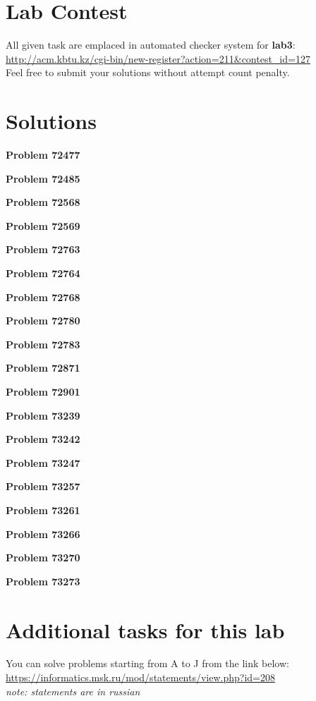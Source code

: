\documentclass[12pt]{article}
\begin{document}
    \section{Lab Contest}
        \small
        All given task are emplaced in automated checker system for \textbf{lab3}:
        \\ \url{http://acm.kbtu.kz/cgi-bin/new-register?action=211&contest_id=127}
        \\ Feel free to submit your solutions without attempt count penalty.
        
    \section{Solutions}
        \textbf{Problem 72477}
        
        \textbf{Problem 72485}
        
        \textbf{Problem 72568}
        
        \textbf{Problem 72569}
        
        \textbf{Problem 72763}
        
        \textbf{Problem 72764}
        
        \textbf{Problem 72768}
        
        \textbf{Problem 72780}
        
        \textbf{Problem 72783}
        
        \textbf{Problem 72871}
        
        \textbf{Problem 72901}
        
        \textbf{Problem 73239}
        
        \textbf{Problem 73242}
        
        \textbf{Problem 73247}
        
        \textbf{Problem 73257}
        
        \textbf{Problem 73261}
        
        \textbf{Problem 73266}
        
        \textbf{Problem 73270}
        
        \textbf{Problem 73273}
        


    \section{Additional tasks for this lab}
    You can solve problems starting from A to J from the link below:\\
    \url{https://informatics.msk.ru/mod/statements/view.php?id=208}\\
    \textit{note: statements are in russian}
\end{document}
